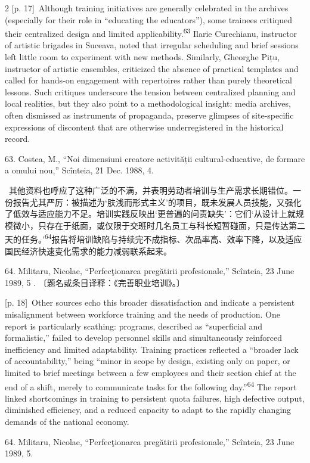 \documentclass[10pt,a4paper]{article}
\begin{document}
\begin{paracol}{2}
\switchcolumn
{\scriptsize\color{gray} [p. 17]}\ Although training initiatives are generally celebrated in the archives (especially for their role in “educating the educators”), some trainees critiqued their centralized design and limited applicability.\nobreak\textsuperscript{63} Ilarie Curechianu, instructor of artistic brigades in Suceava, noted that irregular scheduling and brief sessions left little room to experiment with new methods. Similarly, Gheorghe Pițu, instructor of artistic ensembles, criticized the absence of practical templates and called for hands-on engagement with repertoires rather than purely theoretical lessons. Such critiques underscore the tension between centralized planning and local realities, but they also point to a methodological insight: media archives, often dismissed as instruments of propaganda, preserve glimpses of site-specific expressions of discontent that are otherwise underregistered in the historical record.\par{\small 63. Costea, M., “Noi dimensiuni creatore activității cultural-educative, de formare a omului nou,” Scînteia, 21 Dec. 1988, 4.\par}
\switchcolumn*
{\scriptsize\color{gray} [p. 18]}\ 其他资料也呼应了这种广泛的不满，并表明劳动者培训与生产需求长期错位。一份报告尤其严厉：被描述为‘肤浅而形式主义’的项目，既未发展人员技能，又强化了低效与适应能力不足。培训实践反映出‘更普遍的问责缺失’：它们‘从设计上就规模微小，只存在于纸面，或仅限于交班时几名员工与科长短暂碰面，只是传达第二天的任务。’\nobreak\textsuperscript{64}报告将培训缺陷与持续完不成指标、次品率高、效率下降，以及适应国民经济快速变化需求的能力减弱联系起来。\par{\small 64. Militaru, Nicolae, “Perfecţionarea pregătirii profesionale,” Scînteia, 23 June 1989, 5 . 〔题名或条目译释：《完善职业培训》。〕\par}
\switchcolumn
{\scriptsize\color{gray} [p. 18]}\ Other sources echo this broader dissatisfaction and indicate a persistent misalignment between workforce training and the needs of production. One report is particularly scathing: programs, described as “superficial and formalistic,” failed to develop personnel skills and simultaneously reinforced inefficiency and limited adaptability. Training practices reflected a “broader lack of accountability,” being “minor in scope by design, existing only on paper, or limited to brief meetings between a few employees and their section chief at the end of a shift, merely to communicate tasks for the following day.”\nobreak\textsuperscript{64} The report linked shortcomings in training to persistent quota failures, high defective output, diminished efficiency, and a reduced capacity to adapt to the rapidly changing demands of the national economy.\par{\small 64. Militaru, Nicolae, “Perfecţionarea pregătirii profesionale,” Scînteia, 23 June 1989, 5.\par}

\end{paracol}
\end{document}

